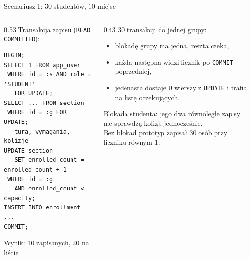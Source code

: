\documentclass[aspectratio=169,11pt]{beamer}
\begin{document}
\begin{frame}[fragile]{Scenariusz 1: 30 studentów, 10 miejsc}
  \begin{columns}[T]
    \begin{column}{0.53\textwidth}
      \small
      Transakcja zapisu (\texttt{READ COMMITTED}):
\begin{lstlisting}
BEGIN;
SELECT 1 FROM app_user
 WHERE id = :s AND role = 'STUDENT'
   FOR UPDATE;
SELECT ... FROM section
 WHERE id = :g FOR UPDATE;
-- tura, wymagania, kolizje
UPDATE section
   SET enrolled_count = enrolled_count + 1
 WHERE id = :g
   AND enrolled_count < capacity;
INSERT INTO enrollment ...
COMMIT;
\end{lstlisting}
      Wynik: 10 zapisanych, 20 na liście.
    \end{column}
    \begin{column}{0.43\textwidth}
      \small
      30 transakcji do jednej grupy:
      \begin{itemize}
        \item blokadę grupy ma jedna, reszta czeka,
        \item każda następna widzi licznik po \texttt{COMMIT} poprzedniej,
        \item jedenasta dostaje 0 wierszy z \texttt{UPDATE} i trafia na listę oczekujących.
      \end{itemize}
      Blokada studenta: jego dwa równoległe zapisy nie sprawdzą kolizji jednocześnie.\\[4pt]
      \footnotesize Bez blokad prototyp zapisał 30 osób przy liczniku równym 1.
    \end{column}
  \end{columns}
\end{frame}
\end{document}
